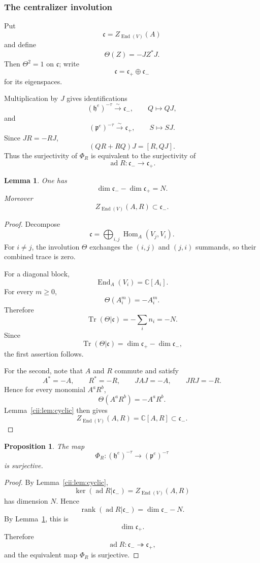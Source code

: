 \documentclass[11pt,reqno]{amsart}
\numberwithin{equation}{section}
\newtheorem{proposition}[theorem]{Proposition}
\newtheorem{lemma}[theorem]{Lemma}
\theoremstyle{definition}
\theoremstyle{remark}
\newcommand{\C}{\mathbb C}
\newcommand{\Hom}{\operatorname{Hom}}
\newcommand{\End}{\operatorname{End}}
\newcommand{\ad}{\operatorname{ad}}
\newcommand{\Tr}{\operatorname{Tr}}
\begin{document}
\subsubsection{The centralizer involution}

Put
\[
\mathfrak c=Z_{\End(V)}(A)
\]
and define
\[
\Theta(Z)=-JZ^*J.
\]
Then \(\Theta^2=1\) on \(\mathfrak c\); write
\[
\mathfrak c=\mathfrak c_+\oplus\mathfrak c_-
\]
for its eigenspaces.

Multiplication by \(J\) gives identifications
\[
(\mathfrak h^e)^{-\tau}\xrightarrow{\sim}\mathfrak c_-,
\qquad
Q\longmapsto QJ,
\]
and
\[
(\mathfrak p^e)^{-\tau}\xrightarrow{\sim}\mathfrak c_+,
\qquad
S\longmapsto SJ.
\]
Since \(JR=-RJ\),
\[
(QR+RQ)J=[R,QJ].
\]
Thus the surjectivity of \(\Phi_R\) is equivalent to the surjectivity of
\[
\ad R:\mathfrak c_-\longrightarrow\mathfrak c_+.
\]

\begin{lemma}\label{cii:lem:dimension-difference}
One has
\[
\dim\mathfrak c_- -\dim\mathfrak c_+=N.
\]
Moreover
\[
Z_{\End(V)}(A,R)\subset\mathfrak c_-.
\]
\end{lemma}

\begin{proof}
Decompose
\[
\mathfrak c
=
\bigoplus_{i,j}\Hom_A(V_j,V_i).
\]
For \(i\neq j\), the involution \(\Theta\) exchanges the \((i,j)\) and
\((j,i)\) summands, so their combined trace is zero.

For a diagonal block,
\[
\End_A(V_i)=\C[A_i].
\]
For every \(m\geq0\),
\[
\Theta(A_i^m)=-A_i^m.
\]
Therefore
\[
\Tr(\Theta|\mathfrak c)
=
-\sum_i n_i=-N.
\]
Since
\[
\Tr(\Theta|\mathfrak c)
=
\dim\mathfrak c_+ -\dim\mathfrak c_-,
\]
the first assertion follows.

For the second, note that \(A\) and \(R\) commute and satisfy
\[
A^*=-A,\qquad R^*=-R,\qquad
JAJ=-A,\qquad JRJ=-R.
\]
Hence for every monomial \(A^aR^b\),
\[
\Theta(A^aR^b)=-A^aR^b.
\]
Lemma~\ref{cii:lem:cyclic} then gives
\[
Z_{\End(V)}(A,R)=\C[A,R]\subset\mathfrak c_-.
\]
\end{proof}

\begin{proposition}\label{cii:prop:surjectivity}
The map
\[
\Phi_R:
(\mathfrak h^e)^{-\tau}
\longrightarrow
(\mathfrak p^e)^{-\tau}
\]
is surjective.
\end{proposition}

\begin{proof}
By Lemma~\ref{cii:lem:cyclic},
\[
\ker(\ad R|\mathfrak c_-)
=
Z_{\End(V)}(A,R)
\]
has dimension \(N\).  Hence
\[
\operatorname{rank}(\ad R|\mathfrak c_-)
=
\dim\mathfrak c_- -N.
\]
By Lemma~\ref{cii:lem:dimension-difference}, this is
\[
\dim\mathfrak c_+.
\]
Therefore
\[
\ad R:\mathfrak c_-\twoheadrightarrow\mathfrak c_+,
\]
and the equivalent map \(\Phi_R\) is surjective.
\end{proof}
\end{document}

